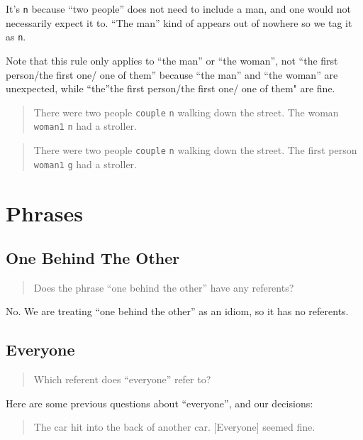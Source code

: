 \documentclass[
]{book}
\begin{document}
It's \texttt{n} because
``two people'' does not need to include a man, and one would not necessarily
expect it to.
``The man'' kind of appears out of nowhere so we tag it as \texttt{n}.

Note that this rule only applies to ``the man'' or ``the woman'', not ``the first person/the first one/ one of them''
because ``the man'' and ``the woman'' are unexpected, while ``the''the first person/the first one/ one of them" are fine.

\begin{quote}
There were two people \texttt{couple} \texttt{n} walking down the street.
The woman \texttt{woman1} \texttt{n} had a stroller.
\end{quote}

\begin{quote}
There were two people \texttt{couple} \texttt{n} walking down the street.
The first person \texttt{woman1} \texttt{g} had a stroller.
\end{quote}

\hypertarget{phrases}{%
\section{Phrases}\label{phrases}}

\hypertarget{one-behind-the-other}{%
\subsection{One Behind The Other}\label{one-behind-the-other}}

\begin{quote}
Does the phrase ``one behind the other'' have any referents?
\end{quote}

No.
We are treating ``one behind the other'' as an idiom, so it has no referents.

\hypertarget{everyone}{%
\subsection{Everyone}\label{everyone}}

\begin{quote}
Which referent does ``everyone'' refer to?
\end{quote}

Here are some previous questions about ``everyone'', and our decisions:

\begin{quote}
The car hit into the back of another car.
{[}Everyone{]} seemed fine.
\end{quote}
\end{document}
